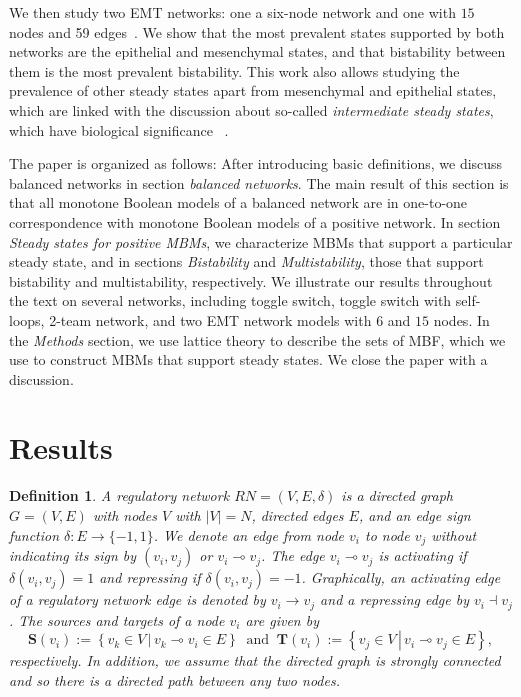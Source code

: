 \documentclass[10pt,letterpaper]{article}
\newcommand{\Targets}{\mathbf{T}}
\newcommand{\Sources}{\mathbf{S}}
\newcommand{\setdef}[2]{\left\{{#1}\,\left|\,{#2}\right.\right\}}
\newtheorem{defn}[thm]{Definition}
\begin{document}
We then study two EMT networks: one a six-node network \cite{hong_ovol2-zeb1_2015} and one with $15$ nodes and 59 edges~\cite{huang_interrogating_2017}. We show that the most prevalent states supported by both networks are the epithelial and mesenchymal states, and that bistability between them is the most prevalent bistability. This work also allows studying the prevalence of other steady states apart from mesenchymal and epithelial states, which are linked with the discussion about so-called \textit{intermediate steady states}, which have biological significance ~\cite{pastushenko_identification_2018}.

The paper is organized as follows:
After introducing basic definitions, we discuss balanced networks in section \textit{balanced networks}. The main result of this section is that all monotone Boolean models of a balanced network are in one-to-one correspondence with monotone Boolean models of a positive network.
In section \textit{Steady states for positive MBMs}, we characterize MBMs that support a particular steady state, and in sections \textit{Bistability} and \textit{Multistability}, those that support bistability and multistability, respectively. We illustrate our results throughout the text on several networks, including toggle switch, toggle switch with self-loops, 2-team network, and two EMT network models with $6$ and $15$ nodes.
In the \textit{Methods} section, we use lattice theory to describe the sets of MBF, which we use to construct MBMs that support steady states.
We close the paper with a discussion.




\section{Results}\label{sec:results}


\begin{defn} \label{def:RN}
A \textit{regulatory network} $RN = (V,E,\delta)$ is a directed graph $G=(V,E)$ with nodes $V$ with $|V|=N$, directed edges $E$, and an edge sign function $\delta: E \to \{-1,1\}$. We denote an edge from node $v_i$ to node $v_j$ without indicating its sign by $(v_i, v_j)$ or $v_i\multimap v_j$. The edge $v_i \multimap v_j$ is \textit{activating} if $\delta(v_i, v_j) = 1$ and \textit{repressing} if $\delta(v_i, v_j) = -1$. Graphically, an activating edge of a regulatory network edge is denoted by $v_i\to v_j$ and a repressing edge by $v_i \dashv v_j$. The \textit{sources} and \textit{targets} of a node $v_i$ are given by 
\[
\Sources(v_i):= \setdef{v_k\in V}{v_k\multimap v_i \in E} \ \text{ and } \ \Targets(v_i):= \setdef{v_j\in V}{v_i\multimap v_j \in E},
\]
respectively.
In addition, we assume that the directed graph is \textit{strongly connected} and so there is a directed path between any two nodes.
\end{defn}
\end{document}
